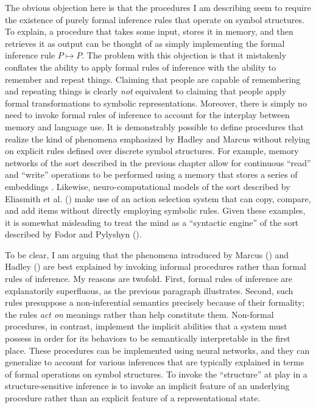 The obvious objection here is that the procedures I am describing seem to require the existence of purely formal inference rules that operate on symbol structures. To explain, a procedure that takes some input, stores it in memory, and then retrieves it as output can be thought of as simply implementing the formal inference rule $P \mapsto P$. The problem with this objection is that it mistakenly conflates the ability to apply formal rules of inference with the ability to remember and repeat things. Claiming that people are capable of remembering and repeating things is clearly \textit{not} equivalent to claiming that people apply formal transformations to symbolic representations. Moreover, there is simply no need to invoke formal rules of inference to account for the interplay between memory and language use. It is demonstrably possible to define procedures that realize the kind of phenomena emphasized by Hadley and Marcus without relying on explicit rules defined over discrete symbol structures. For example, memory networks of the sort described in the previous chapter allow for continuous ``read'' and ``write'' operations to be performed using a memory that stores a series of embeddings \citep{Sukhbataar:2015,Graves:2014}. Likewise, neuro-computational models of the sort described by Eliasmith et al. (\citeyear{Eliasmith:2012}) make use of an action selection system that can copy, compare, and add items without directly employing symbolic rules. Given these examples, it is somewhat misleading to treat the mind as a ``syntactic engine'' of the sort described by Fodor and Pylyshyn (\citeyear{FodorPylyshyn:1988}).

To be clear, I am arguing that the phenomena introduced by Marcus (\citeyear{Marcus:1998}) and Hadley (\citeyear{Hadley:2009}) are best explained by invoking informal procedures rather than formal rules of inference. My reasons are twofold. First, formal rules of inference are explanatorily superfluous, as the previous paragraph illustrates. Second, such rules presuppose a non-inferential semantics precisely because of their formality; the rules \textit{act on} meanings rather than help constitute them. Non-formal procedures, in contrast, implement the implicit abilities that a system must possess in order for its behaviors to be semantically interpretable in the first place. These procedures can be implemented using neural networks, and they can generalize to account for various inferences that are typically explained in terms of formal operations on symbol structures. To invoke the ``structure'' at play in a structure-sensitive inference is to invoke an implicit feature of an underlying procedure rather than an explicit feature of a representational state. 

